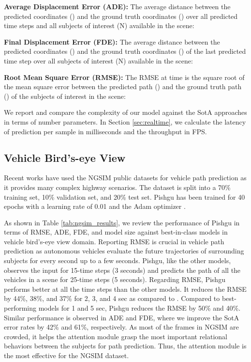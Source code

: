 \documentclass[sigconf]{acmart}
\begin{document}
\textbf{Average Displacement Error (ADE): } The average  distance between the predicted coordinates () and the ground truth coordinates () over all  predicted time steps and all subjects of interest (N) available in the scene:


\textbf{Final Displacement Error (FDE): } The average  distance between the predicted coordinates () and the ground truth coordinates () of the last predicted time step over all subjects of interest (N) available in the scene:



\textbf{Root Mean Square Error (RMSE):}
The RMSE at time  is the square root of the mean square error between the predicted path () and the ground truth path () of the subjects of interest in the scene:



We report and compare the complexity of our model against the SotA approaches in terms of number parameters. In Section \ref{sec:realtime}, we calculate the latency of prediction per sample in milliseconds and the throughput in FPS.










\subsection{Vehicle Bird's-eye View}

Recent works \cite{GSTCN2022, aitp2022,dginet2022} have used the NGSIM public datasets for vehicle path prediction as it provides many complex highway scenarios. The dataset is split into a 70\% training set, 10\% validation set, and 20\% test set. Pishgu has been trained for 40 epochs with a learning rate of 0.01 and the Adam optimizer \cite{kingma2014adam}.


As shown in Table \ref{tab:ngsim_results}, we review the performance of Pishgu in terms of RMSE, ADE, FDE, and model size against best-in-class models \cite{CSlstm18, katariya2021deeptrack, 2020gripplus, Pip2021, GSTCN2022, STALSTM2021} in vehicle bird's-eye view domain. Reporting RMSE is crucial in vehicle path prediction as autonomous vehicles evaluate the future trajectories of surrounding subjects for every second up to a few seconds. Pishgu, like the other models, observes the input for 15-time steps (3 seconds) and predicts the path of all the vehicles in a scene for 25-time steps (5 seconds). Regarding RMSE, Pishgu performs better at all the time steps than the other models. It reduces the RMSE by 44\%, 38\%, and 37\% for 2, 3, and 4 sec as compared to \cite{GSTCN2022}. Compared to best-performing models for 1 and 5 sec, Pishgu reduces the RMSE by 50\% and 40\%. Similar performance is observed in ADE and FDE, where we improve the SotA error rates by 42\% and 61\%, respectively. As most of the frames in NGSIM are crowded, it helps the attention module grasp the most important relational behaviors between the subjects for path prediction. Thus, the attention module is the most effective for the NGSIM dataset.
\end{document}
